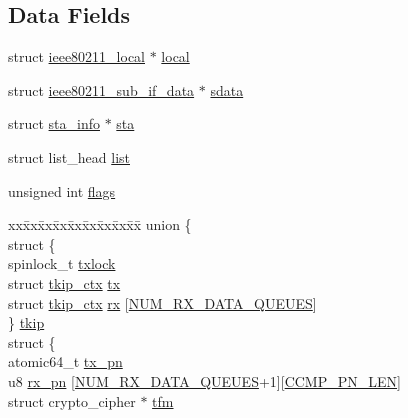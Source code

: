 \subsection*{Data Fields}
\begin{DoxyCompactItemize}
\item 
struct \hyperlink{structieee80211__local}{ieee80211\-\_\-local} $\ast$ \hyperlink{structieee80211__key_ad436a024f420f219c4fe2eebce7e4ab2}{local}
\item 
struct \hyperlink{structieee80211__sub__if__data}{ieee80211\-\_\-sub\-\_\-if\-\_\-data} $\ast$ \hyperlink{structieee80211__key_ad829d8d33f06a7245cc303f924f259ac}{sdata}
\item 
struct \hyperlink{structsta__info}{sta\-\_\-info} $\ast$ \hyperlink{structieee80211__key_aafa9dadbeccd54b4a6b9f77f2908a093}{sta}
\item 
struct list\-\_\-head \hyperlink{structieee80211__key_a1f00f18b91d5a820f2c43064243aa86e}{list}
\item 
unsigned int \hyperlink{structieee80211__key_ac92588540e8c1d014a08cd8a45462b19}{flags}
\item 
\begin{tabbing}
xx\=xx\=xx\=xx\=xx\=xx\=xx\=xx\=xx\=\kill
union \{\\
\>struct \{\\
\>\>spinlock\_t \hyperlink{structieee80211__key_a9b2bd2f2c7f0e62e0e0433a4b4964bca}{txlock}\\
\>\>struct \hyperlink{structtkip__ctx}{tkip\_ctx} \hyperlink{structieee80211__key_a3a974b8d9690b9d3e88e8604538f4cf8}{tx}\\
\>\>struct \hyperlink{structtkip__ctx}{tkip\_ctx} \hyperlink{structieee80211__key_a47e91edc6699fec0d3ddca2c17c58a16}{rx} \mbox{[}\hyperlink{key_8h_a99cb7469613fea382d3951d37ee2c075}{NUM\_RX\_DATA\_QUEUES}\mbox{]}\\
\>\} \hyperlink{structieee80211__key_a1e037cc7cf26e98fb0ab400903c62d50}{tkip}\\
\>struct \{\\
\>\>atomic64\_t \hyperlink{structieee80211__key_a151a5bf95479b1130b341b412e6e3705}{tx\_pn}\\
\>\>u8 \hyperlink{structieee80211__key_af268ed760198a17a7ecd9c352f6f1fc5}{rx\_pn} \mbox{[}\hyperlink{key_8h_a99cb7469613fea382d3951d37ee2c075}{NUM\_RX\_DATA\_QUEUES}+1\mbox{]}\mbox{[}\hyperlink{key_8h_a81046bbc6df45432e2845f0f32222abc}{CCMP\_PN\_LEN}\mbox{]}\\
\>\>struct crypto\_cipher $\ast$ \hyperlink{structieee80211__key_a45576ea98555983d71e70badb9035f67}{tfm}\\

\end{tabbing}
\end{DoxyCompactItemize}
